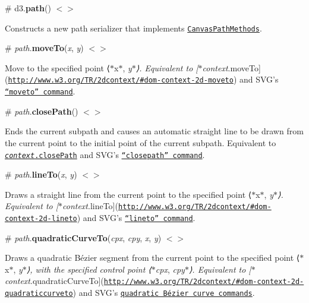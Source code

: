 \label{_path}%
\# d3.{\bfseries path}() \href{https://github.com/d3/d3-path/blob/master/src/path.js}{\tt $<$$>$}

Constructs a new path serializer that implements \href{http://www.w3.org/TR/2dcontext/#canvaspathmethods}{\tt Canvas\+Path\+Methods}.

\label{_path_moveTo}%
\# {\itshape path}.{\bfseries move\+To}({\itshape x}, {\itshape y}) \href{https://github.com/d3/d3-path/blob/master/src/path.js#L18}{\tt $<$$>$}

Move to the specified point ⟨$\ast$x$\ast$, {\itshape y$\ast$⟩. Equivalent to \mbox{[}$\ast$context}.move\+To\mbox{]}(\href{http://www.w3.org/TR/2dcontext/#dom-context-2d-moveto}{\tt http\+://www.\+w3.\+org/\+T\+R/2dcontext/\#dom-\/context-\/2d-\/moveto}) and S\+V\+G’s \href{http://www.w3.org/TR/SVG/paths.html#PathDataMovetoCommands}{\tt “moveto” command}.

\label{_path_closePath}%
\# {\itshape path}.{\bfseries close\+Path}() \href{https://github.com/d3/d3-path/blob/master/src/path.js#L21}{\tt $<$$>$}

Ends the current subpath and causes an automatic straight line to be drawn from the current point to the initial point of the current subpath. Equivalent to \href{http://www.w3.org/TR/2dcontext/#dom-context-2d-closepath}{\tt {\itshape context}.close\+Path} and S\+V\+G’s \href{http://www.w3.org/TR/SVG/paths.html#PathDataClosePathCommand}{\tt “closepath” command}.

\label{_path_lineTo}%
\# {\itshape path}.{\bfseries line\+To}({\itshape x}, {\itshape y}) \href{https://github.com/d3/d3-path/blob/master/src/path.js#L27}{\tt $<$$>$}

Draws a straight line from the current point to the specified point ⟨$\ast$x$\ast$, {\itshape y$\ast$⟩. Equivalent to \mbox{[}$\ast$context}.line\+To\mbox{]}(\href{http://www.w3.org/TR/2dcontext/#dom-context-2d-lineto}{\tt http\+://www.\+w3.\+org/\+T\+R/2dcontext/\#dom-\/context-\/2d-\/lineto}) and S\+V\+G’s \href{http://www.w3.org/TR/SVG/paths.html#PathDataLinetoCommands}{\tt “lineto” command}.

\label{_path_quadraticCurveTo}%
\# {\itshape path}.{\bfseries quadratic\+Curve\+To}({\itshape cpx}, {\itshape cpy}, {\itshape x}, {\itshape y}) \href{https://github.com/d3/d3-path/blob/master/src/path.js#L30}{\tt $<$$>$}

Draws a quadratic Bézier segment from the current point to the specified point ⟨$\ast$x$\ast$, {\itshape y$\ast$⟩, with the specified control point ⟨$\ast$cpx}, {\itshape cpy$\ast$⟩. Equivalent to \mbox{[}$\ast$context}.quadratic\+Curve\+To\mbox{]}(\href{http://www.w3.org/TR/2dcontext/#dom-context-2d-quadraticcurveto}{\tt http\+://www.\+w3.\+org/\+T\+R/2dcontext/\#dom-\/context-\/2d-\/quadraticcurveto}) and S\+V\+G’s \href{http://www.w3.org/TR/SVG/paths.html#PathDataQuadraticBezierCommands}{\tt quadratic Bézier curve commands}.

